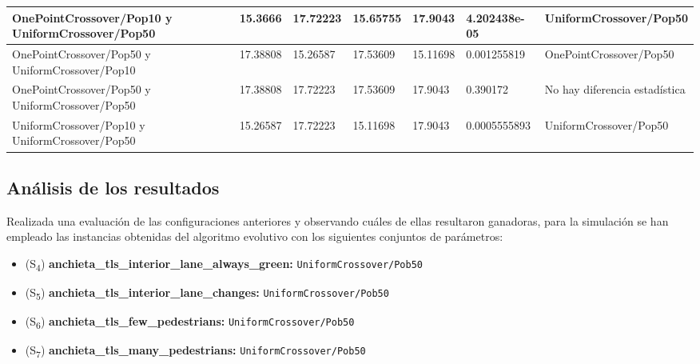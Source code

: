 \begin{table}
{\begin{tabular}{lllllll}
    OnePointCrossover/Pop10 y UniformCrossover/Pop50                    & 15.3666               & 17.72223              & 15.65755              & 17.9043               & 4.202438e-05                                          & UniformCrossover/Pop50                                \\ \hline
    OnePointCrossover/Pop50 y UniformCrossover/Pop10                    & 17.38808              & 15.26587              & 17.53609              & 15.11698              & 0.001255819                                           & OnePointCrossover/Pop50                               \\ \hline
    OnePointCrossover/Pop50 y UniformCrossover/Pop50                    & 17.38808              & 17.72223              & 17.53609              & 17.9043               & 0.390172                                              & No hay diferencia estadística                         \\ \hline
    UniformCrossover/Pop10 y UniformCrossover/Pop50                     & 15.26587              & 17.72223              & 15.11698              & 17.9043               & 0.0005555893                                          & UniformCrossover/Pop50                                \\ \hline
    \end{tabular}}
\end{table}


\subsection{Análisis de los resultados}
\label{subsec:analisis-resultados-configuraciones}

Realizada una evaluación de las configuraciones anteriores y observando cuáles de ellas resultaron ganadoras, para la simulación se han empleado las instancias obtenidas del algoritmo evolutivo con los siguientes conjuntos de parámetros:

\begin{itemize}
    \item (S\textsubscript{4}) \textbf{anchieta\_tls\_interior\_lane\_always\_green:} \texttt{UniformCrossover/Pob50}
    \item (S\textsubscript{5}) \textbf{anchieta\_tls\_interior\_lane\_changes:} \texttt{UniformCrossover/Pob50}
    \item (S\textsubscript{6}) \textbf{anchieta\_tls\_few\_pedestrians:} \texttt{UniformCrossover/Pob50}
    \item (S\textsubscript{7}) \textbf{anchieta\_tls\_many\_pedestrians:} \texttt{UniformCrossover/Pob50}
\end{itemize}

